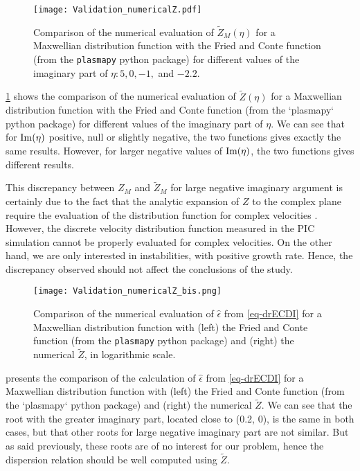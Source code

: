   \begin{figure}[!hbt]
    \centering
    \texttt{[image: Validation\_numericalZ.pdf]}
    \caption{Comparison of the numerical evaluation of $\tilde{Z}_M(\eta)$ for a Maxwellian distribution function with the Fried and Conte function (from the \texttt{plasmapy} python package) for different values of the imaginary part of $\eta: 5, 0,-1,$ and $-2.2$.  }
    \label{fig-numZ}
  \end{figure}
  \cref{fig-numZ} shows the comparison of the numerical evaluation of $\tilde{Z}(\eta)$ for a Maxwellian distribution function with the Fried and Conte function (from the `plasmapy` python package) for different values of the imaginary part of $\eta$.
  We can see that for ${\rm Im}(\eta)$ positive, null or slightly negative, the two functions gives exactly the same results.
  However, for larger negative values of ${\rm Im}(\eta)$, the two functions gives different results.
  
  This discrepancy between $Z_M$ and $\tilde{Z}_M$ for large negative imaginary argument is certainly due to the fact that the analytic expansion of $Z$ to the complex plane require the evaluation of the distribution function for complex velocities \citep{xie2013,weideman1995}.
  However, the discrete velocity distribution function measured in the \ac{PIC} simulation cannot be properly evaluated for complex velocities.
  On the other hand, we are only interested in instabilities, with positive growth rate.
  Hence, the discrepancy observed should not affect the conclusions of the study.
  


  \begin{figure}[hbt]
    \centering
    \texttt{[image: Validation\_numericalZ\_bis.png]}
    \caption{Comparison of the numerical evaluation of $\hat\epsilon$ from \cref{eq-drECDI} for a Maxwellian distribution function with (left) the Fried and Conte function (from the \texttt{plasmapy} python package) and (right) the numerical $\tilde{Z}$, in logarithmic scale.  }
    \label{fig-numZbis}
  \end{figure}
  
   presents the comparison of the calculation of $\hat\epsilon$ from \cref{eq-drECDI} for a Maxwellian distribution function with (left) the Fried and Conte function (from the `plasmapy` python package) and (right) the numerical $\tilde{Z}$.
  We can see that the root with the greater imaginary part, located close to (0.2, 0), is the same in both cases, but that other roots for large negative imaginary part are not similar.
  But as said previously, these roots are of no interest for our problem, hence the dispersion relation should be well computed using $\tilde{Z}$.
  

